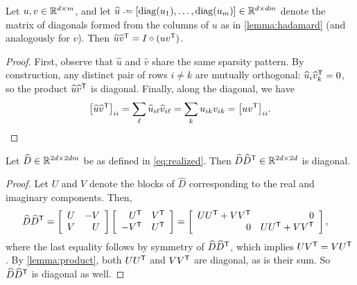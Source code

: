 \documentclass{article} %
\begin{document}
\begin{lemma}
Let ${u, v \in \mathbb{R}^{d\times m}}$, and let ${\widehat{u} \defeq
[\diag(u_1),\dots,\diag(u_m)] \in \R^{d\times dm}}$ denote the 
matrix of diagonals formed from the columns of $u$ as in \cref{lemma:hadamard} 
(and analogously for $v$).  Then ${\widehat{u}\widehat{v}^\mathsf{T} = I \circ (uv^\mathsf{T})}$.
\label{lemma:product}
\end{lemma}
\begin{proof}
First, observe that $\widehat{u}$ and $\widehat{v}$ share the same sparsity pattern.  
By construction, any distinct pair of rows $i \neq k$ are mutually orthogonal:
$\widehat{u}_i \widehat{v}_k^\mathsf{T} = 0$, so the product $\widehat{u}\widehat{v}^\mathsf{T}$ 
is diagonal.  Finally, along the diagonal, we have
\[
{\left[\widehat{u}\widehat{v}^\mathsf{T}\right]}_{ii} = \sum_\ell \widehat{u}_{i\ell}
\widehat{v}_{i\ell} = \sum_{k} u_{ik} v_{ik} = {\left[uv^\mathsf{T}\right]}_{ii}.
\]
\end{proof}

\begin{theorem}
Let $\widehat{D} \in \mathbb{R}^{2d\times 2dm}$ be as defined in \eqref{eq:realized}.  Then
$\widehat{D}\widehat{D}^\mathsf{T} \in \mathbb{R}^{2d\times 2d}$ is diagonal.\label{thm:diagonal}
\end{theorem}
\begin{proof}
Let $U$ and $V$ denote the blocks of $\widehat{D}$ corresponding to the
real and imaginary components.  Then,
\begin{align}
\widehat{D}\widehat{D}^\mathsf{T} = \left[\begin{array}{rr}U & -V\\ V & U\end{array}\right]
\left[\begin{array}{rr} U^\mathsf{T} & V^\mathsf{T}\\ -V^\mathsf{T} & U^\mathsf{T}\end{array}\right]
&= \left[\begin{array}{rr}UU^\mathsf{T} + VV^\mathsf{T} & 0 \\ 0 & UU^\mathsf{T} + VV^\mathsf{T}\end{array}
\right],\label{eq:dictpower}
\end{align}
where the last equality follows by symmetry of $\widehat{D}\widehat{D}^\mathsf{T}$, which 
implies $UV^\mathsf{T} = VU^\mathsf{T}$.  By \cref{lemma:product}, both $UU^\mathsf{T}$ and $VV^\mathsf{T}$ 
are diagonal, as is their sum.  So $\widehat{D}\widehat{D}^\mathsf{T}$ is diagonal as well.
\end{proof}
\end{document}
